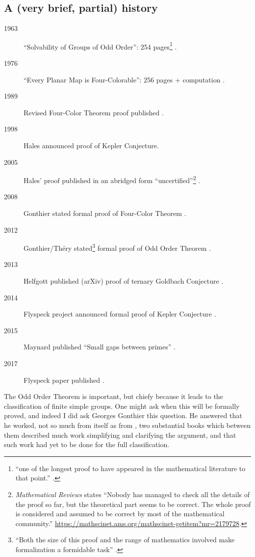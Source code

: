 \subsection{A (very brief, partial) history}
\begin{description}
\item[1963]``Solvability of Groups of Odd Order'': 254 pages\footnote{``one of the longest proof to have appeared in the mathematical literature to that point.'' \cite{Gonthieretal2013a}.} \cite{FeitThompson1963}.
\item[1976]``Every Planar Map is Four-Colorable'': 256 pages + computation \cite{AppelHaken1976a}.
\item[1989]Revised Four-Color Theorem proof published \cite{AppelHaken1989}.
\item[1998]Hales announced proof of Kepler Conjecture.
\item[2005]Hales' proof published in an abridged form ``uncertified''\footnote{\emph{Mathematical Reviews} states ``Nobody has managed to check all the details of the proof so far, but the theoretical part seems to be correct. The whole proof is considered and assumed to be correct by most of the mathematical community.'' \url{https://mathscinet.ams.org/mathscinet-getitem?mr=2179728}.} \cite{Hales2005}.
\item[2008]Gonthier stated formal proof of Four-Color Theorem \cite{Gonthier2008}.
\item[2012]Gonthier/Th\'ery stated\footnote{``Both the size of this proof and the range of mathematics involved make formalization
a formidable task'' \cite{Gonthieretal2013a}.} formal proof of Odd Order Theorem \cite{GonthierThery2012a,Gonthieretal2013a}.
\item[2013]Helfgott published (arXiv) proof of ternary Goldbach Conjecture \cite{Helfgott2013a}.
\item[2014]Flyspeck project announced formal proof of Kepler Conjecture \cite{Hales2014a}.
\item[2015]Maynard published ``Small gaps between primes'' \cite{Maynard2015a}.
\item[2017]Flyspeck paper published \cite{Halesetal2017a}.
\end{description}
The Odd Order Theorem is important, but chiefy because it leads to the classification of finite simple groups. One might ask when this will be formally proved, and indeed I did ask Georges Gonthier this question. He answered that he worked, not so much from \cite{FeitThompson1963} itself as from \cite{Benderetal1994,Peterfalvi2000}, two substantial books which between them described much work simplifying  and clarifying the argument, and that such work had yet to be done for the full classification.

